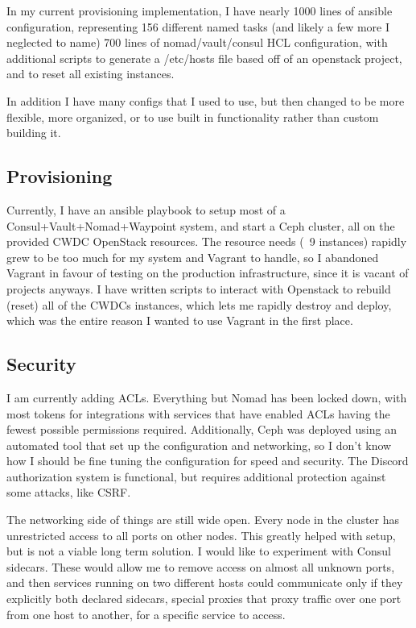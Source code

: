 \documentclass{article}
\begin{document}
In my current provisioning implementation, I have nearly 1000 lines of ansible configuration, representing 156 different named tasks (and likely a few more I neglected to name) 700 lines of nomad/vault/consul HCL configuration, with additional scripts to generate a /etc/hosts file based off of an openstack project, and to reset all existing instances.

In addition I have many configs that I used to use, but then changed to be more flexible, more organized, or to use built in functionality rather than custom building it.

\subsection{Provisioning}
Currently, I have an ansible playbook to setup most of a Consul+Vault+Nomad+Waypoint system, and start a Ceph cluster, all on the provided CWDC OpenStack resources. The resource needs (~9 instances) rapidly grew to be too much for my system and Vagrant to handle, so I abandoned Vagrant in favour of testing on the production infrastructure, since it is vacant of projects anyways. I have written scripts to interact with Openstack to rebuild (reset) all of the CWDCs instances, which lets me rapidly destroy and deploy, which was the entire reason I wanted to use Vagrant in the first place.

\subsection{Security}
I am currently adding ACLs. Everything but Nomad has been locked down, with most tokens for integrations with services that have enabled ACLs having the fewest possible permissions required. Additionally, Ceph was deployed using an automated tool that set up the configuration and networking, so I don't know how I should be fine tuning the configuration for speed and security. The Discord authorization system is functional, but requires additional protection against some attacks, like CSRF.


The networking side of things are still wide open. Every node in the cluster has unrestricted access to all ports on other nodes. This greatly helped with setup, but is not a viable long term solution. I would like to experiment with Consul sidecars. These would allow me to remove access on almost all unknown ports, and then services running on two different hosts could communicate only if they explicitly both declared sidecars, special proxies that proxy traffic over one port from one host to another, for a specific service to access.
\end{document}
